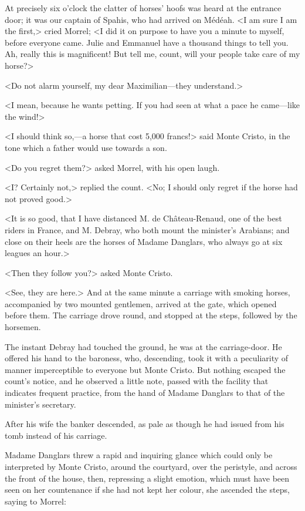  At precisely six o'clock the clatter of horses' hoofs was heard at the entrance door; it was our captain of Spahis, who had arrived on Médéah. <I am sure I am the first,> cried Morrel; <I did it on purpose to have you a minute to myself, before everyone came. Julie and Emmanuel have a thousand things to tell you. Ah, really this is magnificent! But tell me, count, will your people take care of my horse?> 

 <Do not alarm yourself, my dear Maximilian—they understand.> 

 <I mean, because he wants petting. If you had seen at what a pace he came—like the wind!> 

 <I should think so,—a horse that cost 5,000 francs!> said Monte Cristo, in the tone which a father would use towards a son. 

 <Do you regret them?> asked Morrel, with his open laugh. 

 <I? Certainly not,> replied the count. <No; I should only regret if the horse had not proved good.> 

 <It is so good, that I have distanced M. de Château-Renaud, one of the best riders in France, and M. Debray, who both mount the minister's Arabians; and close on their heels are the horses of Madame Danglars, who always go at six leagues an hour.> 

 <Then they follow you?> asked Monte Cristo. 

 <See, they are here.> And at the same minute a carriage with smoking horses, accompanied by two mounted gentlemen, arrived at the gate, which opened before them. The carriage drove round, and stopped at the steps, followed by the horsemen. 

 The instant Debray had touched the ground, he was at the carriage-door. He offered his hand to the baroness, who, descending, took it with a peculiarity of manner imperceptible to everyone but Monte Cristo. But nothing escaped the count's notice, and he observed a little note, passed with the facility that indicates frequent practice, from the hand of Madame Danglars to that of the minister's secretary. 

 After his wife the banker descended, as pale as though he had issued from his tomb instead of his carriage. 

 Madame Danglars threw a rapid and inquiring glance which could only be interpreted by Monte Cristo, around the courtyard, over the peristyle, and across the front of the house, then, repressing a slight emotion, which must have been seen on her countenance if she had not kept her colour, she ascended the steps, saying to Morrel: 

